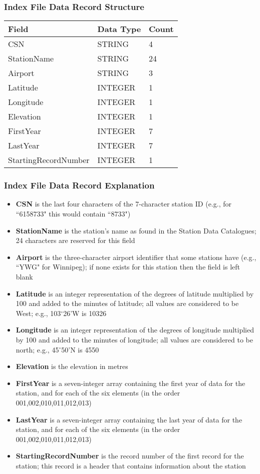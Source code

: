 \documentclass[12pt]{article}
\begin{document}
\subsubsection{Index File Data Record Structure}
\begin{center}
\begin{tabular}{l | l | l}
Field & Data Type & Count \\
\hline
CSN & STRING & 4 \\
StationName & STRING & 24 \\
Airport & STRING & 3 \\
Latitude & INTEGER & 1 \\
Longitude & INTEGER & 1 \\
Elevation & INTEGER & 1 \\
FirstYear & INTEGER & 7 \\
LastYear & INTEGER & 7 \\
StartingRecordNumber & INTEGER & 1
\end{tabular}
\end{center}

\subsubsection{Index File Data Record Explanation}
\begin{itemize}
\item \textbf{CSN} is the last four characters of the 7-character station ID (e.g., for ``6158733" this would contain ``8733")
\item \textbf{StationName} is the station's name as found in the Station Data Catalogues; 24 characters are reserved for this field
\item \textbf{Airport} is the three-character airport identifier that some stations have (e.g., ``YWG" for Winnipeg); if none exists for this station then the field is left blank
\item \textbf{Latitude} is an integer representation of the degrees of latitude multiplied by 100 and added to the minutes of latitude; all values are considered to be West; e.g., 103$^\circ$26'W is 10326
\item \textbf{Longitude} is an integer representation of the degrees of longitude multiplied by 100 and added to the minutes of longitude; all values are considered to be north; e.g., 45$^\circ$50'N is 4550
\item \textbf{Elevation} is the elevation in metres
\item \textbf{FirstYear} is a seven-integer array containing the first year of data for the station, and for each of the six elements (in the order 001,002,010,011,012,013)
\item \textbf{LastYear} is a seven-integer array containing the last year of data for the station, and for each of the six elements (in the order 001,002,010,011,012,013)
\item \textbf{StartingRecordNumber} is the record number of the first record for the station; this record is a header that contains information about the station
\end{itemize}
\end{document}
